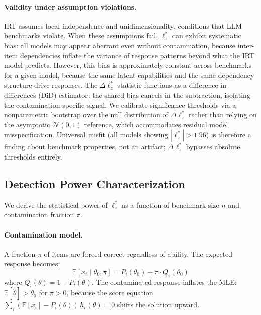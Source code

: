 \paragraph{Validity under assumption violations.}
IRT assumes local independence and unidimensionality, conditions that LLM benchmarks violate.
When these assumptions fail, $\ell_z^*$ can exhibit systematic bias: all models may appear aberrant even without contamination, because inter-item dependencies inflate the variance of response patterns beyond what the IRT model predicts.
However, this bias is approximately constant across benchmarks for a given model, because the same latent capabilities and the same dependency structure drive responses.
The $\Delta\ell_z^*$ statistic functions as a difference-in-differences (DiD) estimator: the shared bias cancels in the subtraction, isolating the contamination-specific signal.
We calibrate significance thresholds via a nonparametric bootstrap over the null distribution of $\Delta\ell_z^*$ rather than relying on the asymptotic $\mathcal{N}(0,1)$ reference, which accommodates residual model misspecification.
Universal misfit (all models showing $|\ell_z^*| > 1.96$) is therefore a finding about benchmark properties, not an artifact; $\Delta\ell_z^*$ bypasses absolute thresholds entirely.

\subsection{Detection Power Characterization}
\label{sec:power_theory}

We derive the statistical power of $\ell_z^*$ as a function of benchmark size $n$ and contamination fraction $\pi$.

\paragraph{Contamination model.}
A fraction $\pi$ of items are forced correct regardless of ability.
The expected response becomes:
\begin{equation}
  \mathbb{E}[x_i \mid \theta_0, \pi] = P_i(\theta_0) + \pi \cdot Q_i(\theta_0)
  \label{eq:contam_response}
\end{equation}
where $Q_i(\theta) = 1 - P_i(\theta)$.
The contaminated response inflates the MLE: $\mathbb{E}[\hat{\theta}] > \theta_0$ for $\pi > 0$, because the score equation $\sum_i (\mathbb{E}[x_i] - P_i(\theta))\,h_i(\theta) = 0$ shifts the solution upward.

